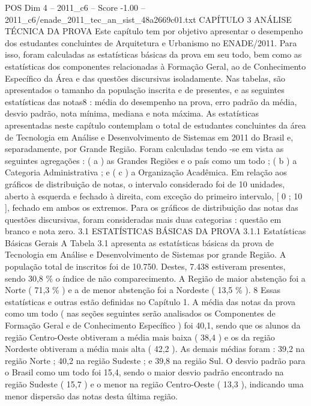 \begin{textsample}{POS Dim 4 – 2011\_c6 – Score -1.00 – 2011\_c6/enade\_2011\_tec\_an\_sist\_48a2669c01.txt}  \label{ex:f4_pos_303}
CAPÍTULO 3 ANÁLISE TÉCNICA DA PROVA Este capítulo tem por objetivo apresentar o desempenho dos estudantes concluintes de Arquitetura e Urbanismo no ENADE/2011.
Para isso, foram calculadas as estatísticas básicas da prova em seu todo, bem como as estatísticas dos componentes relacionadas à Formação Geral, ao de Conhecimento Específico da Área e das questões discursivas isoladamente.
Nas tabelas, são apresentados o tamanho da população inscrita e de presentes, e as seguintes estatísticas das notas8 : média do desempenho na prova, erro padrão da média, desvio padrão, nota mínima, mediana e nota máxima.
As estatísticas apresentadas neste capítulo contemplam o total de estudantes concluintes da área de Tecnologia em Análise e Desenvolvimento de Sistemas em 2011 do Brasil e, separadamente, por Grande Região.
Foram calculadas tendo -se em vista as seguintes agregações : ( a ) as Grandes Regiões e o país como um todo ; ( b ) a Categoria Administrativa ; e ( c ) a Organização Acadêmica.
Em relação aos gráficos de distribuição de notas, o intervalo considerado foi de 10 unidades, aberto à esquerda e fechado à direita, com exceção do primeiro intervalo, [ 0 ; 10 ], fechado em ambos os extremos.
Para os gráficos de distribuição das notas das questões discursivas, foram consideradas mais duas categorias : questão em branco e nota zero. 3.1 ESTATÍSTICAS BÁSICAS DA PROVA 3.1.1 Estatísticas Básicas Gerais A Tabela 3.1 apresenta as estatísticas básicas da prova de Tecnologia em Análise e Desenvolvimento de Sistemas por grande Região.
A população total de inscritos foi de 10.750.
Destes, 7.438 estiveram presentes, sendo 30,8 \% o índice de não comparecimento.
A Região de maior abstenção foi a Norte ( 71,3 \% ) e a de menor abstenção foi a Nordeste ( 13,5 \% ). 8 Essas estatísticas e outras estão definidas no Capítulo 1.
A média das notas da prova como um todo ( nas seções seguintes serão analisados os Componentes de Formação Geral e de Conhecimento Específico ) foi 40,1, sendo que os alunos da região Centro-Oeste obtiveram a média mais baixa ( 38,4 ) e os da região Nordeste obtiveram a média mais alta ( 42,2 ).
As demais médias foram : 39,2 na região Norte ; 40,2 na região Sudeste ; e 39,8 na região Sul.
O desvio padrão para o Brasil como um todo foi 15,4, sendo o maior desvio padrão encontrado na região Sudeste ( 15,7 ) e o menor na região Centro-Oeste ( 13,3 ), indicando uma menor dispersão das notas desta última região.

\end{textsample}
